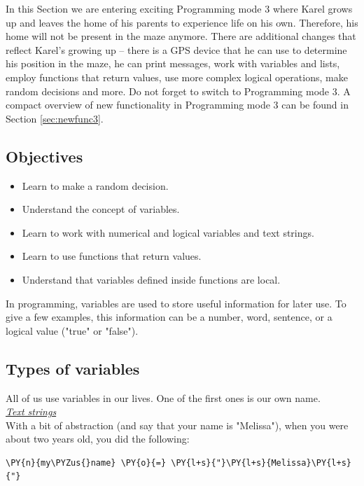 In this Section we are entering exciting Programming mode 3 where Karel grows up and leaves the 
home of his parents to experience life on his own. Therefore, his home will not be 
present in the maze anymore. There are additional changes
that reflect Karel's growing up -- there is a GPS 
device that he can use to determine his position in the maze, he can print messages, 
work with variables and lists, employ functions that return values, use more complex 
logical operations, make random 
decisions and more. Do not forget to switch to 
Programming mode 3. A compact overview of new functionality in Programming mode 3 can be found 
in Section \ref{sec:newfunc3}.

\subsection[\ \ Objectives]{Objectives} 
 
\begin{itemize}
\item Learn to make a random decision.
\item Understand the concept of variables.
\item Learn to work with numerical and logical variables and text strings.
\item Learn to use functions that return values. 
\item Understand that variables defined inside functions are local. 
\end{itemize}

\noindent
In programming, variables are used to store useful information for later use. 
To give a few examples, this information can be a number, word, sentence, 
or a logical value ("true" or "false").

\subsection[\ \ Types of variables]{Types of variables}

All of us use variables in our lives. One of 
the first ones is our own name. \\

\noindent
\underline{\em Text strings}\\

\noindent
With a bit of abstraction (and say that your name is "Melissa"), 
when you were about two years old, you did the following:\\

\begin{bbox}
\begin{Verbatim}[commandchars=\\\{\}]
\PY{n}{my\PYZus{}name} \PY{o}{=} \PY{l+s}{"}\PY{l+s}{Melissa}\PY{l+s}{"}
\end{Verbatim}
\end{bbox}
\vspace{6mm}

